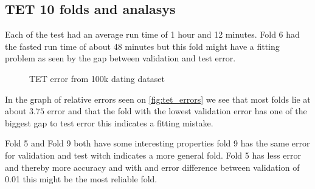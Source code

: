 \subsection{TET 10 folds and analasys}
Each of the test had an average run time of 1 hour and 12 minutes.  Fold 6 had the fasted run time of about 48 minutes but this fold might have a fitting problem as seen by the gap between validation and test error.

\begin{figure}[H]
	\centering
	\begin{adjustbox}{width=0.5\textwidth}
		
	\end{adjustbox}
	\caption{TET error from 100k dating dataset }
	\label{fig:tet_errors}
\end{figure}

In the graph of relative errors seen on \autoref{fig:tet_errors} we see that most folds lie at about $3.75$ error and that the fold with the lowest validation error has one of the biggest gap to test error this indicates a fitting mistake. 

Fold 5 and Fold 9 both have some interesting properties fold 9 has the same error for validation and test witch indicates a more general fold. Fold 5 has less error and thereby more accuracy and with and error difference between validation of 0.01 this might be the most reliable fold.
